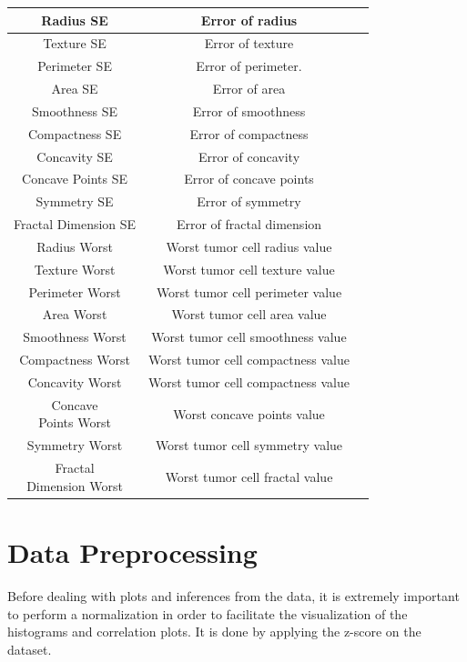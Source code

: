 \documentclass[conference]{IEEEtran}
\begin{document}
\begin{table}[htbp]
\begin{center}
\begin{tabular}{|c|c|c|}
    \hline
    Radius SE & Error of radius &  \\
    \hline
    Texture SE & Error of texture &  \\
    \hline
    Perimeter SE & Error of perimeter. &  \\
    \hline
    Area SE & Error of area &  \\
    \hline
    Smoothness SE & Error of smoothness &  \\
    \hline
    Compactness SE & Error of compactness &  \\
    \hline
    Concavity SE & Error of concavity &  \\
    \hline
    Concave Points SE & Error of concave points &  \\
    \hline
    Symmetry SE & Error of symmetry &  \\
    \hline
    Fractal Dimension SE & Error of fractal dimension &  \\
    \hline
    Radius Worst & Worst tumor cell radius value &  \\
    \hline
    Texture Worst & Worst tumor cell texture value &  \\
    \hline
    Perimeter Worst &  Worst tumor cell perimeter value&  \\
    \hline
    Area Worst &  Worst tumor cell area value &  \\
    \hline
    Smoothness Worst & Worst tumor cell smoothness value &  \\
    \hline
    Compactness Worst &  Worst tumor cell compactness value &  \\
    \hline
    Concavity Worst & Worst tumor cell compactness value &  \\
    \hline
    \makecell{Concave \\ Points Worst} & Worst concave points value &  \\
    \hline
    Symmetry Worst & Worst tumor cell symmetry value &  \\
    \hline
    \makecell{Fractal \\ Dimension Worst} & Worst tumor cell fractal value &  \\
    \hline
\end{tabular}
\label{tab:Summary}
\end{center}
\end{table}


\section{Data Preprocessing}
Before dealing with plots and inferences from the data, it is extremely important to 
perform a normalization in order to facilitate the visualization of the histograms 
and correlation plots. It is done by applying the z-score on the dataset.
\end{document}
